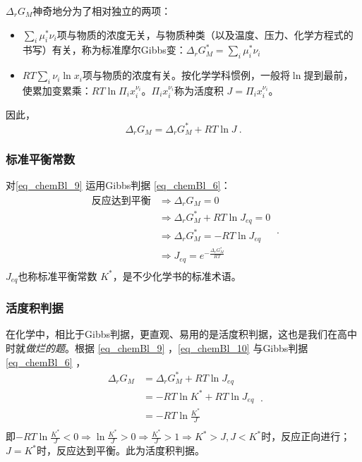 $\Delta_r G_M$神奇地分为了相对独立的两项：
\begin{itemize}
\item $\sum_i \mu_i^* \nu_i$项与物质的浓度无关，与物质种类（以及温度、压力、化学方程式的书写）有关，称为标准摩尔Gibbs变：$\Delta_r G_M^* = \sum_i \mu_i^* \nu_i$
\item $RT \sum_i \nu_i \ln x_i$项与物质的浓度有关。按化学学科惯例，一般将$\ln$提到最前，使累加变累乘：$RT \ln \Pi_i x_i^{\nu_i}$。$\Pi_i x_i^{\nu_i}$称为活度积 $J=\Pi_i x_i^{\nu_i}$。
\end{itemize}
因此，\begin{equation} \label{eq_chemBl_9}
\Delta_r G_M = \Delta_r G_M^* + RT \ln J~.
\end{equation}

\subsubsection{标准平衡常数}
对\autoref{eq_chemBl_9} 运用Gibbs判据 \autoref{eq_chemBl_6}：
\begin{equation} \label{eq_chemBl_10}
\begin{aligned}
\text{反应达到平衡} &\Rightarrow \Delta_r G_M = 0\\
&\Rightarrow \Delta_r G_M^* + RT \ln J_{eq} = 0\\
&\Rightarrow \Delta_r G_M^* = - RT \ln J_{eq}\\
&\Rightarrow J_{eq} = e^{-\frac{\Delta_r G_M^*}{RT}}\\
\end{aligned}~.
\end{equation}
$J_{eq}$也称标准平衡常数 $K^*$，是不少化学书的标准术语。

\subsubsection{活度积判据}
在化学中，相比于Gibbs判据，更直观、易用的是活度积判据，这也是我们在高中时就\textsl{做烂的题}。根据 \autoref{eq_chemBl_9} ，\autoref{eq_chemBl_10} 与Gibbs判据 \autoref{eq_chemBl_6} ，
$$
\begin{aligned}
\Delta_r G_M & = \Delta_r G_M^* + RT \ln J_{eq}\\
& = - RT \ln K^* + RT \ln J_{eq}\\
& = - RT \ln \frac{K^*}{J} \\
\end{aligned}~.
$$
即$- RT \ln \frac{K^*}{J}<0 \Rightarrow \ln \frac{K^*}{J} >0 \Rightarrow \frac{K^*}{J} >1 \Rightarrow K^*>J, J<K^*$时，反应正向进行；$J=K^*$时，反应达到平衡。此为活度积判据。

